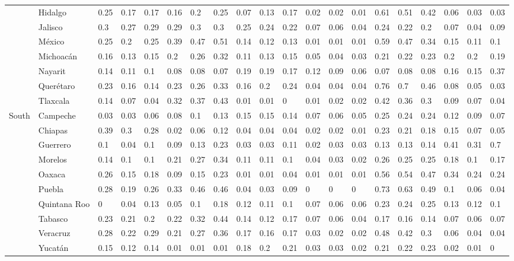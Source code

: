 \documentclass[11.5pt]{article}
\begin{document}
{\begin{landscape}
\begin{table}[ht]
\begin{footnotesize}
\begin{tabular}{lllll|lll|lll|lll|lll|lll}
   & Hidalgo & 0.25 & 0.17 & 0.17 & 0.16 & 0.2 & 0.25 & 0.07 & 0.13 & 0.17 & 0.02 & 0.02 & 0.01 & 0.61 & 0.51 & 0.42 & 0.06 & 0.03 & 0.03 \\ 
   & Jalisco & 0.3 & 0.27 & 0.29 & 0.29 & 0.3 & 0.3 & 0.25 & 0.24 & 0.22 & 0.07 & 0.06 & 0.04 & 0.24 & 0.22 & 0.2 & 0.07 & 0.04 & 0.09 \\ 
   & M\'exico & 0.25 & 0.2 & 0.25 & 0.39 & 0.47 & 0.51 & 0.14 & 0.12 & 0.13 & 0.01 & 0.01 & 0.01 & 0.59 & 0.47 & 0.34 & 0.15 & 0.11 & 0.1 \\ 
   & Michoac\'an & 0.16 & 0.13 & 0.15 & 0.2 & 0.26 & 0.32 & 0.11 & 0.13 & 0.15 & 0.05 & 0.04 & 0.03 & 0.21 & 0.22 & 0.23 & 0.2 & 0.2 & 0.19 \\ 
   & Nayarit & 0.14 & 0.11 & 0.1 & 0.08 & 0.08 & 0.07 & 0.19 & 0.19 & 0.17 & 0.12 & 0.09 & 0.06 & 0.07 & 0.08 & 0.08 & 0.16 & 0.15 & 0.37 \\ 
   & Quer\'etaro & 0.23 & 0.16 & 0.14 & 0.23 & 0.26 & 0.33 & 0.16 & 0.2 & 0.24 & 0.04 & 0.04 & 0.04 & 0.76 & 0.7 & 0.46 & 0.08 & 0.05 & 0.03 \\ 
   & Tlaxcala & 0.14 & 0.07 & 0.04 & 0.32 & 0.37 & 0.43 & 0.01 & 0.01 & 0 & 0.01 & 0.02 & 0.02 & 0.42 & 0.36 & 0.3 & 0.09 & 0.07 & 0.04 \\ 
  South & Campeche & 0.03 & 0.03 & 0.06 & 0.08 & 0.1 & 0.13 & 0.15 & 0.15 & 0.14 & 0.07 & 0.06 & 0.05 & 0.25 & 0.24 & 0.24 & 0.12 & 0.09 & 0.07 \\ 
   & Chiapas & 0.39 & 0.3 & 0.28 & 0.02 & 0.06 & 0.12 & 0.04 & 0.04 & 0.04 & 0.02 & 0.02 & 0.01 & 0.23 & 0.21 & 0.18 & 0.15 & 0.07 & 0.05 \\ 
   & Guerrero & 0.1 & 0.04 & 0.1 & 0.09 & 0.13 & 0.23 & 0.03 & 0.03 & 0.11 & 0.02 & 0.03 & 0.03 & 0.13 & 0.13 & 0.14 & 0.41 & 0.31 & 0.7 \\ 
   & Morelos & 0.14 & 0.1 & 0.1 & 0.21 & 0.27 & 0.34 & 0.11 & 0.11 & 0.1 & 0.04 & 0.03 & 0.02 & 0.26 & 0.25 & 0.25 & 0.18 & 0.1 & 0.17 \\ 
   & Oaxaca & 0.26 & 0.15 & 0.18 & 0.09 & 0.15 & 0.23 & 0.01 & 0.01 & 0.04 & 0.01 & 0.01 & 0.01 & 0.56 & 0.54 & 0.47 & 0.34 & 0.24 & 0.24 \\ 
   & Puebla & 0.28 & 0.19 & 0.26 & 0.33 & 0.46 & 0.46 & 0.04 & 0.03 & 0.09 & 0 & 0 & 0 & 0.73 & 0.63 & 0.49 & 0.1 & 0.06 & 0.04 \\ 
   & Quintana Roo & 0 & 0.04 & 0.13 & 0.05 & 0.1 & 0.18 & 0.12 & 0.11 & 0.1 & 0.07 & 0.06 & 0.06 & 0.23 & 0.24 & 0.25 & 0.13 & 0.12 & 0.1 \\ 
   & Tabasco & 0.23 & 0.21 & 0.2 & 0.22 & 0.32 & 0.44 & 0.14 & 0.12 & 0.17 & 0.07 & 0.06 & 0.04 & 0.17 & 0.16 & 0.14 & 0.07 & 0.06 & 0.07 \\ 
   & Veracruz & 0.28 & 0.22 & 0.29 & 0.21 & 0.27 & 0.36 & 0.17 & 0.16 & 0.17 & 0.03 & 0.02 & 0.02 & 0.48 & 0.42 & 0.3 & 0.06 & 0.04 & 0.04 \\ 
   & Yucat\'an & 0.15 & 0.12 & 0.14 & 0.01 & 0.01 & 0.01 & 0.18 & 0.2 & 0.21 & 0.03 & 0.03 & 0.02 & 0.21 & 0.22 & 0.23 & 0.02 & 0.01 & 0 \\  
  

\end{tabular}
\end{footnotesize}
\end{table}
\end{landscape}}
\end{document}
